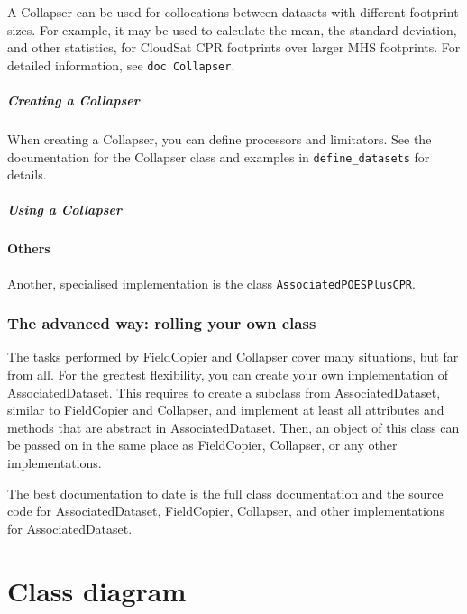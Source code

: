 \documentclass[a4paper,10pt]{article}
\begin{document}
A Collapser can be used for collocations between datasets with different
footprint sizes.
For example, it may be used to calculate the mean, the standard deviation, and
other statistics, for CloudSat \gls{CPR} footprints over larger \gls{MHS}
footprints.
For detailed information, see \lstinline|doc Collapser|.

\subparagraph{Creating a Collapser}

When creating a Collapser, you can define processors and limitators.
See the documentation for the Collapser class and examples in
\lstinline|define_datasets| for details.

\subparagraph{Using a Collapser}

\paragraph{Others}

Another, specialised implementation is the class
\lstinline|AssociatedPOESPlusCPR|.

\subsubsection{The advanced way: rolling your own class}
\label{sec:advanced}

The tasks performed by FieldCopier and Collapser cover many situations, but
far from all.
For the greatest flexibility, you can create your own implementation of
AssociatedDataset.
This requires to create a subclass from AssociatedDataset, similar to
FieldCopier and Collapser, and implement at least all attributes and methods
that are abstract in AssociatedDataset.
Then, an object of this class can be passed on in the same place as
FieldCopier, Collapser, or any other implementations.

The best documentation to date is the full class documentation and the source
code for AssociatedDataset, FieldCopier, Collapser, and other implementations
for AssociatedDataset.

\section{Class diagram}
\end{document}

